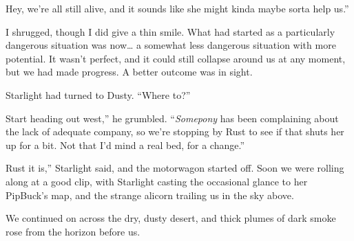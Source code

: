 \leavevmode{}Hey, we’re all still alive, and it sounds like she might kinda maybe sorta help us.”

I shrugged, though I did give a thin smile. What had started as a particularly dangerous situation was now… a somewhat less dangerous situation with more potential. It wasn’t perfect, and it could still collapse around us at any moment, but we had made progress. A better outcome was in sight.

Starlight had turned to Dusty. “Where to?”

\leavevmode{}Start heading out west,” he grumbled. “\textit{Somepony} has been complaining about the lack of adequate company, so we’re stopping by Rust to see if that shuts her up for a bit. Not that I’d mind a real bed, for a change.”

\leavevmode{}Rust it is,” Starlight said, and the motorwagon started off. Soon we were rolling along at a good clip, with Starlight casting the occasional glance to her PipBuck’s map, and the strange alicorn trailing us in the sky above.

We continued on across the dry, dusty desert, and thick plumes of dark smoke rose from the horizon before us.